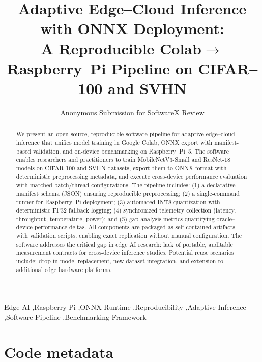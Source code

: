\documentclass[review]{elsarticle}
\begin{document}
\begin{frontmatter}

\title{Adaptive Edge--Cloud Inference with ONNX Deployment:\\
A Reproducible Colab$\boldsymbol{\rightarrow}$Raspberry~Pi Pipeline on CIFAR--100 and SVHN}

\author[inst1]{Anonymous Submission for SoftwareX Review}
\address[inst1]{To be revealed upon acceptance}

\begin{abstract}
We present an open-source, reproducible software pipeline for adaptive edge--cloud inference that unifies model training in Google Colab, ONNX export with manifest-based validation, and on-device benchmarking on Raspberry~Pi~5. The software enables researchers and practitioners to train MobileNetV3-Small and ResNet-18 models on CIFAR-100 and SVHN datasets, export them to ONNX format with deterministic preprocessing metadata, and execute cross-device performance evaluation with matched batch/thread configurations. The pipeline includes: (1) a declarative manifest schema (JSON) ensuring reproducible preprocessing; (2) a single-command runner for Raspberry~Pi deployment; (3) automated INT8 quantization with deterministic FP32 fallback logging; (4) synchronized telemetry collection (latency, throughput, temperature, power); and (5) gap analysis metrics quantifying oracle--device performance deltas. All components are packaged as self-contained artifacts with validation scripts, enabling exact replication without manual configuration. The software addresses the critical gap in edge AI research: lack of portable, auditable measurement contracts for cross-device inference studies. Potential reuse scenarios include: drop-in model replacement, new dataset integration, and extension to additional edge hardware platforms.
\end{abstract}

\begin{keyword}
Edge AI \sep Raspberry Pi \sep ONNX Runtime \sep Reproducibility \sep Adaptive Inference \sep Software Pipeline \sep Benchmarking Framework
\end{keyword}

\end{frontmatter}

\linenumbers

\section*{Code metadata}
\end{document}
